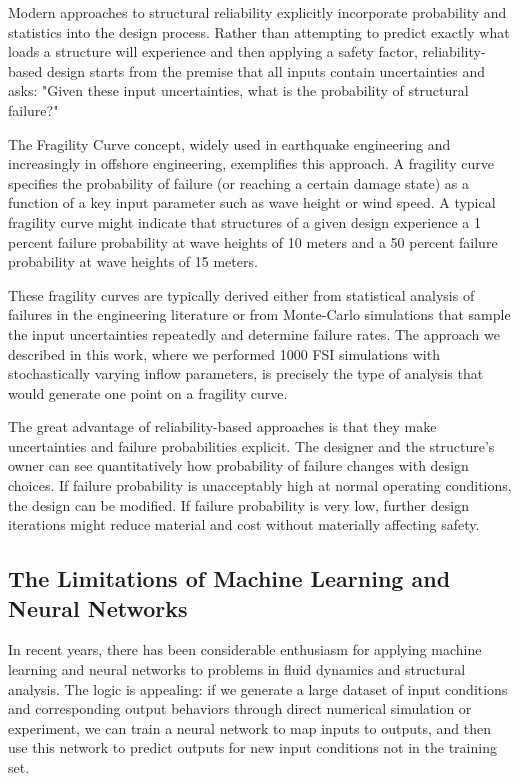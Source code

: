 ﻿\documentclass[a4paper,11pt]{article}
\theoremstyle{definition}
\begin{document}
Modern approaches to structural reliability explicitly incorporate probability and statistics into the design process. Rather than attempting to predict exactly what loads a structure will experience and then applying a safety factor, reliability-based design starts from the premise that all inputs contain uncertainties and asks: "Given these input uncertainties, what is the probability of structural failure?"

The Fragility Curve concept, widely used in earthquake engineering and increasingly in offshore engineering, exemplifies this approach. A fragility curve specifies the probability of failure (or reaching a certain damage state) as a function of a key input parameter such as wave height or wind speed. A typical fragility curve might indicate that structures of a given design experience a 1 percent failure probability at wave heights of 10 meters and a 50 percent failure probability at wave heights of 15 meters.

These fragility curves are typically derived either from statistical analysis of failures in the engineering literature or from Monte-Carlo simulations that sample the input uncertainties repeatedly and determine failure rates. The approach we described in this work, where we performed 1000 FSI simulations with stochastically varying inflow parameters, is precisely the type of analysis that would generate one point on a fragility curve.

The great advantage of reliability-based approaches is that they make uncertainties and failure probabilities explicit. The designer and the structure's owner can see quantitatively how probability of failure changes with design choices. If failure probability is unacceptably high at normal operating conditions, the design can be modified. If failure probability is very low, further design iterations might reduce material and cost without materially affecting safety.

\subsection{The Limitations of Machine Learning and Neural Networks}

In recent years, there has been considerable enthusiasm for applying machine learning and neural networks to problems in fluid dynamics and structural analysis. The logic is appealing: if we generate a large dataset of input conditions and corresponding output behaviors through direct numerical simulation or experiment, we can train a neural network to map inputs to outputs, and then use this network to predict outputs for new input conditions not in the training set.
\end{document}
